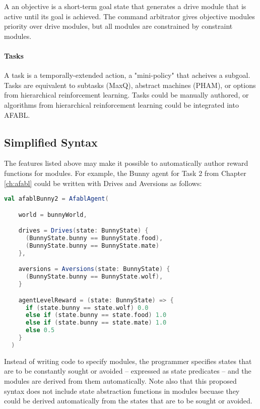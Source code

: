 A an objective is a short-term goal state that generates a drive module that is active until its goal is achieved.  The command arbitrator gives objective modules priority over drive modules, but all modules are constrained by constraint modules.

\paragraph{Tasks}

A task is a temporally-extended action, a "mini-policy" that acheives a subgoal.  Tasks are equivalent to subtasks (MaxQ), abstract machines (PHAM), or options from hierarchical reinforcement learning. Tasks could be manually authored, or algorithms from hierarchical reinforcement learning could be integrated into AFABL.

\subsection{Simplified Syntax}

The features listed above may make it possible to automatically author reward functions for modules. For example, the Bunny agent for Task 2 from Chapter \ref{ch:afabl} could be written with Drives and Aversions as follows:

\begin{lstlisting}[language=Scala]
  val afablBunny2 = AfablAgent(

    world = bunnyWorld,

    drives = Drives(state: BunnyState) {
      (BunnyState.bunny == BunnyState.food),
      (BunnyState.bunny == BunnyState.mate)
    },

    aversions = Aversions(state: BunnyState) {
      (BunnyState.bunny == BunnyState.wolf),
    }

    agentLevelReward = (state: BunnyState) => {
      if (state.bunny == state.wolf) 0.0
      else if (state.bunny == state.food) 1.0
      else if (state.bunny == state.mate) 1.0
      else 0.5
    }
  )
\end{lstlisting}

Instead of writing code to specify modules, the programmer specifies states that are to be constantly sought or avoided -- expressed as state predicates -- and the modules are derived from them automatically. Note also that this proposed syntax does not include state abstraction functions in modules becuase they could be derived automatically from the states that are to be sought or avoided.


